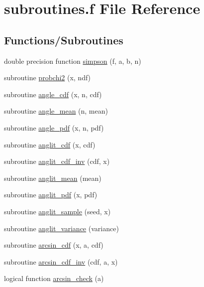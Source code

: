 \hypertarget{subroutines_8f}{}\section{subroutines.\+f File Reference}
\label{subroutines_8f}
\subsection*{Functions/\+Subroutines}
\begin{DoxyCompactItemize}
\item 
double precision function \hyperlink{subroutines_8f_a2ee8433b8e896ef918c415e17cb0e493}{simpson} (f, a, b, n)
\item 
subroutine \hyperlink{subroutines_8f_a74f0d3f55816e1b65f581a43349f89ba}{probchi2} (x, ndf)
\item 
subroutine \hyperlink{subroutines_8f_ae6b2a5c8e81763258a2b02d8ed0f4bc9}{angle\+\_\+cdf} (x, n, cdf)
\item 
subroutine \hyperlink{subroutines_8f_a83d4ecc8f5a46cbc25cac2fb7937bd44}{angle\+\_\+mean} (n, mean)
\item 
subroutine \hyperlink{subroutines_8f_aea97ae5ed563aa63a80df4f38d19e289}{angle\+\_\+pdf} (x, n, pdf)
\item 
subroutine \hyperlink{subroutines_8f_ae6f220f29d92fd5e4ac84c22029dcbc5}{anglit\+\_\+cdf} (x, cdf)
\item 
subroutine \hyperlink{subroutines_8f_aac69fb6d192dd21c8a01a0b768047f59}{anglit\+\_\+cdf\+\_\+inv} (cdf, x)
\item 
subroutine \hyperlink{subroutines_8f_aedd5857199140786c9bc4b031062c55e}{anglit\+\_\+mean} (mean)
\item 
subroutine \hyperlink{subroutines_8f_a6ac310db648e48aed924a16a04c1ba4e}{anglit\+\_\+pdf} (x, pdf)
\item 
subroutine \hyperlink{subroutines_8f_ad8650a8f15bfee60252281a20c85516e}{anglit\+\_\+sample} (seed, x)
\item 
subroutine \hyperlink{subroutines_8f_a4e147e31b56df3c9c2751b91de61ba28}{anglit\+\_\+variance} (variance)
\item 
subroutine \hyperlink{subroutines_8f_ad1ea95ee407eec1875a81feb0d44d6e1}{arcsin\+\_\+cdf} (x, a, cdf)
\item 
subroutine \hyperlink{subroutines_8f_aeba9ed4e4b270a2c19780190aaaed016}{arcsin\+\_\+cdf\+\_\+inv} (cdf, a, x)
\item 
logical function \hyperlink{subroutines_8f_a6106c25a912dbdfd3a3016548132640e}{arcsin\+\_\+check} (a)

\end{DoxyCompactItemize}
